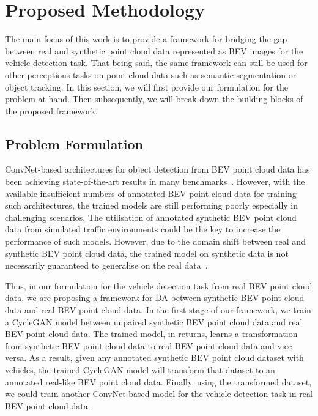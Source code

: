 \documentclass[letterpaper, 10 pt, conference]{IEEEtran}
\begin{document}
\section{Proposed Methodology}\label{method}
The main focus of this work is to provide a framework for bridging the gap between real and synthetic point cloud data represented as BEV images for the vehicle detection task. That being said, the same framework can still be used for other perceptions tasks on point cloud data such as semantic segmentation or object tracking. In this section, we will first provide our formulation for the problem at hand. Then subsequently, we will break-down the building blocks of the proposed framework. 

\subsection{Problem Formulation}
ConvNet-based architectures for object detection from BEV point cloud data has been achieving state-of-the-art results in many benchmarks~\cite{li20173d}. However, with the available insufficient numbers of annotated BEV point cloud data for training such architectures, the trained models are still performing poorly especially in challenging scenarios. The utilisation of annotated synthetic BEV point cloud data from simulated traffic environments could be the key to increase the performance of such models. However, due to the domain shift between real and synthetic BEV point cloud data, the trained model on synthetic data is not necessarily guaranteed to generalise on the real data~\cite{wu2018squeezesegv2}. 



\smallbreak
Thus, in our formulation for the vehicle detection task from real BEV point cloud data, we are proposing a framework for DA between synthetic BEV point cloud data and real BEV point cloud data. In the first stage of our framework, we train a CycleGAN model between unpaired synthetic BEV point cloud data and real BEV point cloud data. The trained model, in returns, learns a transformation from synthetic BEV point cloud data to real BEV point cloud data and vice versa. As a result, given any annotated synthetic BEV point cloud dataset with vehicles, the trained CycleGAN model will transform that dataset to an annotated real-like BEV point cloud data. Finally, using the transformed dataset, we could train another ConvNet-based model for the vehicle detection task in real BEV point cloud data.  
\end{document}
